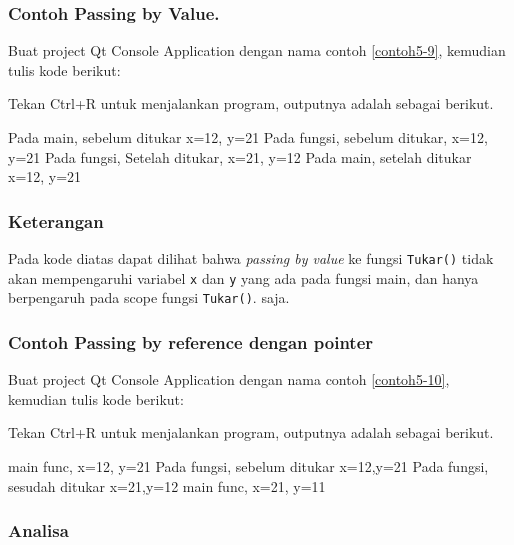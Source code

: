 \subsubsection*{Contoh  Passing by Value.}

Buat project Qt Console Application dengan nama contoh \ref{contoh5-9}, kemudian tulis
kode berikut:



Tekan Ctrl+R untuk menjalankan program, outputnya adalah sebagai
berikut.

\begin{lcverbatim}
Pada main, sebelum ditukar x=12, y=21
Pada fungsi, sebelum ditukar, x=12, y=21
Pada fungsi, Setelah ditukar, x=21, y=12
Pada main, setelah ditukar x=12, y=21
\end{lcverbatim}

\subsubsection*{Keterangan}

Pada kode diatas dapat dilihat bahwa \emph{passing by value} ke fungsi
\texttt{Tukar()} tidak akan mempengaruhi variabel \texttt{x} dan
\texttt{y} yang ada pada fungsi main, dan hanya berpengaruh pada scope
fungsi \texttt{Tukar()}. saja.

\subsubsection*{Contoh Passing by reference dengan pointer}

Buat project Qt Console Application dengan nama contoh \ref{contoh5-10}, kemudian
tulis kode berikut:



Tekan Ctrl+R untuk menjalankan program, outputnya adalah sebagai
berikut.

\begin{lcverbatim}
main func, x=12, y=21
Pada fungsi, sebelum ditukar x=12,y=21
Pada fungsi, sesudah ditukar x=21,y=12
main func, x=21, y=11
\end{lcverbatim}

\subsubsection*{Analisa}

